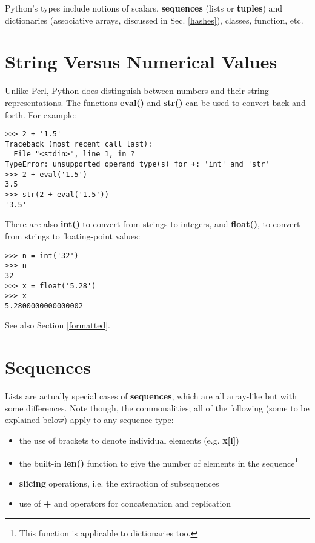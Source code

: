 Python's types include notions of scalars, {\bf sequences} (lists or
{\bf tuples}) and dictionaries (associative arrays, discussed in Sec.
\ref{hashes}), classes, function, etc. 

\section{String Versus Numerical Values}

Unlike Perl, Python does distinguish between numbers and their string
representations.  The functions {\bf eval()} and {\bf str()} can be used
to convert back and forth.  For example:

\begin{Verbatim}[fontsize=\relsize{-2}]
>>> 2 + '1.5'
Traceback (most recent call last):
  File "<stdin>", line 1, in ?
TypeError: unsupported operand type(s) for +: 'int' and 'str'
>>> 2 + eval('1.5')
3.5
>>> str(2 + eval('1.5'))
'3.5'
\end{Verbatim}

There are also {\bf int()} to convert from strings to integers, and {\bf
float()}, to convert from strings to floating-point values:

\begin{Verbatim}[fontsize=\relsize{-2}]
>>> n = int('32')
>>> n
32
>>> x = float('5.28')
>>> x
5.2800000000000002
\end{Verbatim} 

See also Section \ref{formatted}. 

\section{Sequences}

Lists are actually special cases of {\bf sequences}, which are all
array-like but with some differences.  Note though, the commonalities;
all of the following (some to be explained below) apply to any sequence
type:

\begin{itemize}

\item the use of brackets to denote individual elements (e.g. {\bf
x[i]})

\item the built-in {\bf len()} function to give the number of elements
in the sequence\footnote{This function is applicable to dictionaries
too.}

\item {\bf slicing} operations, i.e. the extraction of subsequences 

\item use of {\bf +} and {\bf *} operators for concatenation and
replication

\end{itemize}

